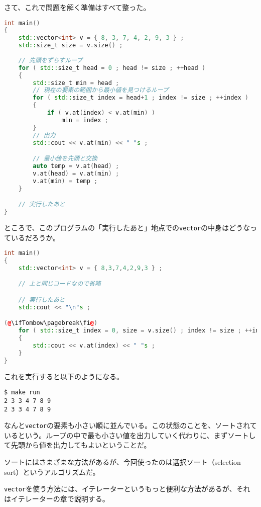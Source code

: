 さて、これで問題を解く準備はすべて整った。

\begin{lstlisting}[language={C++}]
int main()
{
    std::vector<int> v = { 8, 3, 7, 4, 2, 9, 3 } ;
    std::size_t size = v.size() ;
   
    // 先頭をずらすループ 
    for ( std::size_t head = 0 ; head != size ; ++head )
    {
        std::size_t min = head ;
        // 現在の要素の範囲から最小値を見つけるループ
        for ( std::size_t index = head+1 ; index != size ; ++index )
        {
            if ( v.at(index) < v.at(min) )
                min = index ;
        }
        // 出力
        std::cout << v.at(min) << " "s ;

        // 最小値を先頭と交換
        auto temp = v.at(head) ;
        v.at(head) = v.at(min) ;
        v.at(min) = temp ;
    }

    // 実行したあと
}
\end{lstlisting}

ところで、このプログラムの「実行したあと」地点での\texttt{vector}の中身はどうなっているだろうか。

\begin{lstlisting}[language={C++}]
int main()
{
    std::vector<int> v = { 8,3,7,4,2,9,3 } ;

    // 上と同じコードなので省略

    // 実行したあと
    std::cout << "\n"s ;

(@\ifTombow\pagebreak\fi@)
    for ( std::size_t index = 0, size = v.size() ; index != size ; ++index )
    {
        std::cout << v.at(index) << " "s ;
    }
}
\end{lstlisting}

これを実行すると以下のようになる。

\begin{lstlisting}[style=terminal]
$ make run
2 3 3 4 7 8 9
2 3 3 4 7 8 9
\end{lstlisting}

なんと\texttt{vector}の要素も小さい順に並んでいる。この状態のことを、ソートされているという。ループの中で最も小さい値を出力していく代わりに、まずソートして先頭から値を出力してもよいということだ。

ソートにはさまざまな方法があるが、今回使ったのは選択ソート（selection sort）というアルゴリズムだ。

\texttt{vector}を使う方法には、イテレーターというもっと便利な方法があるが、それはイテレーターの章で説明する。
